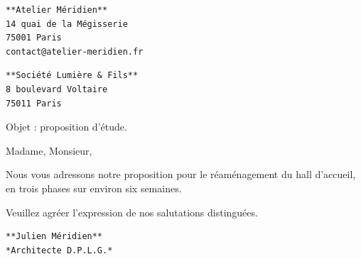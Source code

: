\documentclass[11pt,a4paper]{article}
\title{}
\author{Test Author \\ Test Org}
\date{2026-01-01}
\theoremstyle{definition}
\begin{document}
\begin{lstlisting}
**Atelier Méridien**
14 quai de la Mégisserie
75001 Paris
contact@atelier-meridien.fr
\end{lstlisting}


\begin{lstlisting}
**Société Lumière & Fils**
8 boulevard Voltaire
75011 Paris
\end{lstlisting}


Objet : proposition d'étude.


Madame, Monsieur,


Nous vous adressons notre proposition pour le réaménagement du hall
d'accueil, en trois phases sur environ six semaines.


Veuillez agréer l'expression de nos salutations distinguées.


\begin{lstlisting}
**Julien Méridien**
*Architecte D.P.L.G.*
\end{lstlisting}
\end{document}
